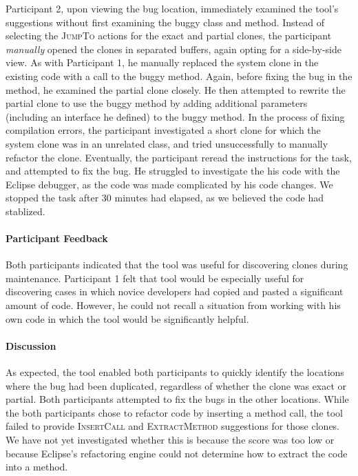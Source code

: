 \documentclass[nocopyrightspace,10pt]{sigplanconf}
\begin{document}
Participant 2, upon viewing the bug location, immediately examined the
tool's suggestions without first examining the buggy class and method.
Instead of selecting the \textsc{JumpTo} actions for the exact and
partial clones, the participant \textit{manually} opened the clones in separated
buffers, again opting for a side-by-side view. As with Participant 1,
he manually replaced the system clone in the existing code with a call
to the buggy method. Again, before fixing the bug in the method, he
examined the partial clone closely. He then attempted to rewrite the partial
clone to use the buggy method by adding additional parameters
(including an interface he defined) to the buggy method. In the
process of fixing compilation errors, the participant investigated a
short clone for which the system clone was in an unrelated
class, and tried unsuccessfully to manually refactor the clone. 
Eventually, the participant reread the instructions for the
task, and attempted to fix the bug. He struggled to investigate the
his code with the Eclipse debugger, as the code was made complicated
by his code changes. We stopped the task after 30 minutes had elapsed,
as we believed the code had stablized.

\paragraph{Participant Feedback}
Both participants indicated that the tool was useful for discovering
clones during maintenance. Participant 1 felt that tool would be
especially useful for discovering cases in which novice developers had
copied and pasted a significant amount of code. However, he could not recall a
situation from working with his own code in which the tool would be
significantly helpful.

\paragraph{Discussion}
As expected, the tool enabled both participants to quickly identify
the locations where the bug had been duplicated, regardless of whether
the clone was exact or partial. Both participants
attempted to fix the bugs in the other locations. 
While the both participants chose to refactor code by
inserting a method call, the tool failed to provide
\textsc{InsertCall} and \textsc{ExtractMethod} suggestions for those
clones. We have not yet investigated whether this is because the score 
was too low or because Eclipse's refactoring engine could
not determine how to extract the code into a method.
\end{document}
